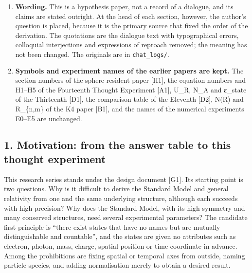 \documentclass[
  a4paper,
]{article}
\begin{document}
\begin{enumerate}
  is not a hole to be filled; it is the content of the hypothesis.
\item
  \textbf{Wording.} This is a hypothesis paper, not a record of a
  dialogue, and its claims are stated outright. At the head of each
  section, however, the author's question is placed, because it is the
  primary source that fixed the order of the derivation. The quotations
  are the dialogue text with typographical errors, colloquial
  interjections and expressions of reproach removed; the meaning has not
  been changed. The originals are in \texttt{chat\_\allowbreak{}logs/\allowbreak{}}.
\item
  \textbf{Symbols and experiment names of the earlier papers are kept.}
  The section numbers of the sphere-resident paper {[}H1{]}, the
  equation numbers and H1--H5 of the Fourteenth Thought Experiment
  {[}A1{]}, U\_R, N\_A and ε\_state of the Thirteenth {[}D1{]}, the
  comparison table of the Eleventh {[}D2{]}, N(R) and R\_\{n,m\} of the
  K4 paper {[}B1{]}, and the names of the numerical experiments E0--E5
  are unchanged.
\end{enumerate}

\subsection{1. Motivation: from the answer table to this thought
experiment}\label{motivation-from-the-answer-table-to-this-thought-experiment}

This research series stands under the design document {[}G1{]}. Its
starting point is two questions. Why is it difficult to derive the
Standard Model and general relativity from one and the same underlying
structure, although each succeeds with high precision? Why does the
Standard Model, with its high symmetry and many conserved structures,
need several experimental parameters? The candidate first principle is
``there exist states that have no names but are mutually distinguishable
and countable'', and the states are given no attributes such as
electron, photon, mass, charge, spatial position or time coordinate in
advance. Among the prohibitions are fixing spatial or temporal axes from
outside, naming particle species, and adding normalisation merely to
obtain a desired result.
\end{document}
